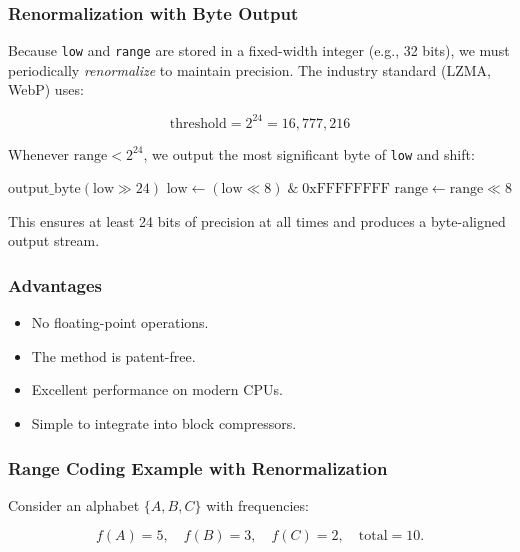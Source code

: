 \subsubsection{Renormalization with Byte Output}

Because \texttt{low} and \texttt{range} are stored in a fixed-width integer (e.g., 32 bits), we must periodically \emph{renormalize} to maintain precision. The industry standard (LZMA, WebP) uses:

\[
\text{threshold} = 2^{24} = 16{,}777{,}216
\]

Whenever $\text{range} < 2^{24}$, we output the most significant byte of \texttt{low} and shift:

\begin{algorithm}[H]
\caption{Renormalization (Industry Standard)}
\begin{algorithmic}[1]
        \State $\text{output\_byte}(\text{low} \gg 24)$
        \State $\text{low} \leftarrow (\text{low} \ll 8) \;\&\; \text{0xFFFFFFFF}$
        \State $\text{range} \leftarrow \text{range} \ll 8$
    \EndWhile
\EndProcedure
\end{algorithmic}
\end{algorithm}

This ensures at least 24 bits of precision at all times and produces a byte-aligned output stream.

\subsubsection{Advantages}

\begin{itemize}
    \item No floating-point operations.
    \item The method is patent-free.
    \item Excellent performance on modern CPUs.
    \item Simple to integrate into block compressors.
\end{itemize}

\subsubsection{Range Coding Example with Renormalization}

Consider an alphabet $\{A,B,C\}$ with frequencies:

\[
f(A) = 5,\quad f(B) = 3,\quad f(C) = 2,\quad \text{total} = 10.
\]

